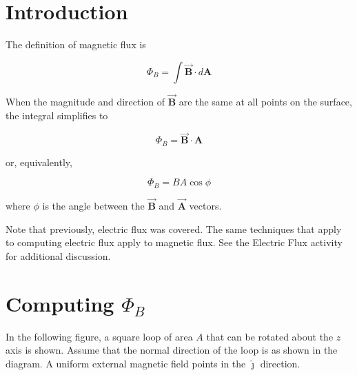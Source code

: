 \documentclass{article}
\newcommand{\jhat}[0]{\hat{\boldsymbol{\jmath}}}
\newcommand{\bfvec}[1]{\vec{\mathbf{#1}}}
\begin{document}
\section{Introduction}

The definition of magnetic flux is

$$\Phi_B = \int \bfvec{B}\cdot d\mathbf{A}$$

When the magnitude and direction of $\bfvec{B}$ are the same at all points on the surface, the integral simplifies to 

$$\Phi_B = \bfvec{B}\cdot \mathbf{A}$$

or, equivalently,

$$\Phi_B = BA\cos\phi$$

where $\phi$ is the angle between the $\bfvec{B}$ and $\bfvec{A}$ vectors.

Note that previously, electric flux was covered. The same techniques that apply to computing electric flux apply to magnetic flux. See the Electric Flux activity for additional discussion.

\ifsolutions

\else

\newpage
\fi

\section{Computing $\Phi_B$}

In the following figure, a square loop of area $A$ that can be rotated about the $z$ axis is shown. Assume that the normal direction of the loop is as shown in the diagram. A uniform external magnetic field points in the $\jhat$ direction.


\end{document}
